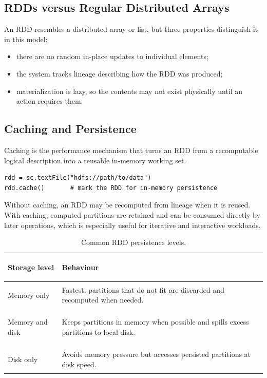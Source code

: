 \documentclass[11pt,a4paper,oneside]{book}
\begin{document}
\subsection{RDDs versus Regular Distributed Arrays}

An RDD resembles a distributed array or list, but three properties distinguish it in this model:

\begin{itemize}
    \item there are no random in-place updates to individual elements;
    \item the system tracks lineage describing how the RDD was produced;
    \item materialization is lazy, so the contents may not exist physically until an action requires them.
\end{itemize}

\subsection{Caching and Persistence}

Caching is the performance mechanism that turns an RDD from a recomputable logical description into a reusable in-memory working set.

\begin{lstlisting}[style=sparkcode]
rdd = sc.textFile("hdfs://path/to/data")
rdd.cache()       # mark the RDD for in-memory persistence
\end{lstlisting}

Without caching, an RDD may be recomputed from lineage when it is reused. With caching, computed partitions are retained and can be consumed directly by later operations, which is especially useful for iterative and interactive workloads.

\begin{table}[htbp]
\centering
\caption{Common RDD persistence levels.}
\label{tab:rdd-persistence-levels}
\begin{tabularx}{0.92\textwidth}{>{\bfseries\raggedright\arraybackslash}p{3.3cm} Y}
\toprule
{}
Storage level & Behaviour \\
\midrule
Memory only & Fastest; partitions that do not fit are discarded and recomputed when needed. \\
Memory and disk & Keeps partitions in memory when possible and spills excess partitions to local disk. \\
Disk only & Avoids memory pressure but accesses persisted partitions at disk speed. \\
\bottomrule
\end{tabularx}
\end{table}
\end{document}

